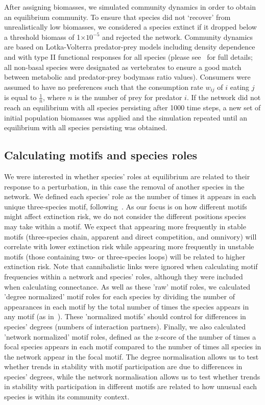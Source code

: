 \documentclass[12pt]{article}
\begin{document}
    After assigning biomasses, we simulated community dynamics in order to obtain an equilibrium community. To ensure that species did not `recover' from unrealistically low biomasses, we considered a species extinct if it dropped below a threshold biomass of 1$\times10^{-5}$ and rejected the network. Community dynamics are based on Lotka-Volterra predator-prey models including density dependence and with type II functional responses for all species (please see~\citet{Delmas2017} for full details; all non-basal species were designated as vertebrates to ensure a good match between metabolic and predator-prey bodymass ratio values). Consumers were assumed to have no preferences such that the consumption rate $w_{ij}$ of $i$ eating $j$ is equal to $\frac{1}{n}$, where $n$ is the number of prey for predator $i$. If the network did not reach an equilibrium with all species persisting after 1000 time steps, a new set of initial population biomasses was applied and the simulation repeated until an equilibrium with all species persisting was obtained. 


  \subsection*{Calculating motifs and species roles}


    We were interested in whether species' roles at equilibrium are related to their response to a perturbation, in this case the removal of another species in the network. We defined each species' role as the number of times it appears in each unique three-species motif, following~\citet{Stouffer2012,Cirtwill2015}. As our focus is on how different motifs might affect extinction risk, we do not consider the different positions species may take within a motif. We expect that appearing more frequently in stable motifs (three-species chain, apparent and direct competition, and omnivory) will correlate with lower extinction risk while appearing more frequently in unstable motifs (those containing two- or three-species loops) will be related to higher extinction risk. Note that cannibalistic links were ignored when calculating motif frequencies within a network and species' roles, although they were included when calculating connectance. As well as these 'raw' motif roles, we calculated 'degree normalized' motif roles for each species by dividing the number of appearances in each motif by the total number of times the species appears in any motif (as in~\citet{Cirtwill2015}). These 'normalized motifs' should control for differences in species' degrees (numbers of interaction partners). Finally, we also calculated 'network normalized' motif roles, defined as the z-score of the number of times a focal species appears in each motif compared to the number of times all species in the network appear in the focal motif.
    The degree normalisation allows us to test whether trends in stability with motif participation are due to differences in species' degrees, while the network normalisation allows us to test whether trends in stability with participation in different motifs are related to how unusual each species is within its community context.
\end{document}
